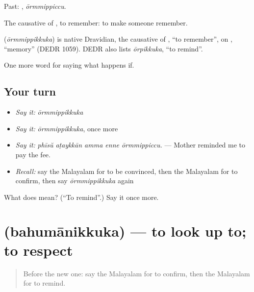 Past: , \emph{ōrmmippiccu}.

The causative of , to remember: to make someone remember.

\begin{cousinweb}
\textbf{} (\emph{ōrmmippikkuka}) is native Dravidian, the causative of , \textquotedblleft{}to remember\textquotedblright{}, on , \textquotedblleft{}memory\textquotedblright{} (DEDR 1059). DEDR also lists \emph{ōrpikkuka}, \textquotedblleft{}to remind\textquotedblright{}.
\end{cousinweb}

\begin{grammarlens}[title={What you've built}]
One more word for saying what happens if.
\end{grammarlens}

\subsection*{Your turn}
\begin{itemize}
\raggedright
  \item \emph{Say it:} \emph{ōrmmippikkuka}
  \item \emph{Say it:} \emph{ōrmmippikkuka}, once more
  \item \emph{Say it:} \emph{phīsŭ aṭaykkān amma enne ōrmmippiccu.} — Mother reminded me to pay the fee.
  \item \emph{Recall:} say the Malayalam for to be convinced, then the Malayalam for to confirm, then say \emph{ōrmmippikkuka} again
\end{itemize}

\begin{tcolorbox}[breakable,colback=teal!4,colframe=teal!35!black,title={Before you move on}]
What does  mean? (\textquotedblleft{}To remind\textquotedblright{}.) Say it once more.
\end{tcolorbox}
\section[\texorpdfstring{\ml{ബഹുമാനിക്കുക} (bahumānikkuka)}{ബഹുമാനിക്കുക (bahumānikkuka)}]{ (bahumānikkuka) — to look up to; to respect}

\label{lesson:ML-C455-bahumanikkuka}



\begin{quote}
Before the new one: say the Malayalam for to confirm, then the Malayalam for to remind.
\end{quote}

